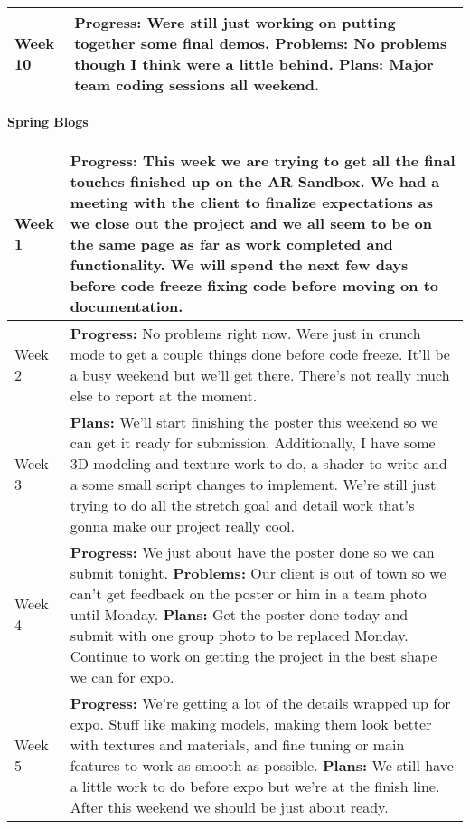 \documentclass[letterpaper, 10pt, onecolumn, draftclsnofoot]{IEEEtran}
\begin{document}
\begin{center}
\begin{longtable}{|p{4cm}|p{10cm}|}
            \hline
            Week 10 & \textbf{Progress:} Were still just working on putting together some final demos. \textbf{Problems:} No problems though I think were a little behind. \textbf{Plans:} Major team coding sessions all weekend. \\
            \hline
        \end{longtable}
        \end{center}
        
        \begin{center}
        \large{\textbf{Spring Blogs}} \\
        \begin{longtable}{|p{4cm}|p{10cm}|}
            \hline
            Week 1 & \textbf{Progress:} This week we are trying to get all the final touches finished up on the AR Sandbox. We had a meeting with the client to finalize expectations as we close out the project and we all seem to be on the same page as far as work completed and functionality. We will spend the next few days before code freeze fixing code before moving on to documentation. \\
            \hline
            Week 2 & \textbf{Progress:} No problems right now. Were just in crunch mode to get a couple things done before code freeze. It'll be a busy weekend but we'll get there. There's not really much else to report at the moment. \\
            \hline
            Week 3 & \textbf{Plans:} We'll start finishing the poster this weekend so we can get it ready for submission. Additionally, I have some 3D modeling and texture work to do, a shader to write and a some small script changes to implement. We're still just trying to do all the stretch goal and detail work that's gonna make our project really cool. \\
            \hline
            Week 4 & \textbf{Progress:} We just about have the poster done so we can submit tonight. \textbf{Problems:} Our client is out of town so we can't get feedback on the poster or him in a team photo until Monday. \textbf{Plans:} Get the poster done today and submit with one group photo to be replaced Monday. Continue to work on getting the project in the best shape we can for expo. \\
            \hline
            Week 5 & \textbf{Progress:} We're getting a lot of the details wrapped up for expo. Stuff like making models, making them look better with textures and materials, and fine tuning or main features to work as smooth as possible. \textbf{Plans:} We still have a little work to do before expo but we're at the finish line. After this weekend we should be just about ready. \\

\end{longtable}
\end{center}
\end{document}
